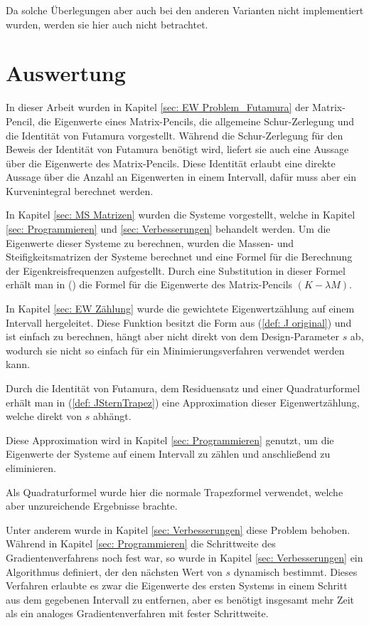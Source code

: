 \documentclass[a4paper,12pt]{report}
\newcommand{\1}{\mathds{1}}
\theoremstyle{plain} %
\theoremstyle{definition} %
\theoremstyle{remark}
\begin{document}
            Da solche Überlegungen aber auch bei den anderen Varianten nicht implementiert wurden, werden sie hier auch nicht betrachtet.
\chapter{Auswertung}
\label{sec: Auswertung}

      In dieser Arbeit wurden in Kapitel \ref{sec: EW Problem_Futamura} der Matrix-Pencil, die Eigenwerte eines Matrix-Pencils, die allgemeine Schur-Zerlegung und die Identität von Futamura vorgestellt.
      Während die Schur-Zerlegung für den Beweis der Identität von Futamura benötigt wird, liefert sie auch eine Aussage über die Eigenwerte des Matrix-Pencils.
      Diese Identität erlaubt eine direkte Aussage über die Anzahl an Eigenwerten in einem Intervall, dafür muss aber ein Kurvenintegral berechnet werden.

      In Kapitel \ref{sec: MS Matrizen} wurden die Systeme vorgestellt, welche in Kapitel \ref{sec: Programmieren} und \ref{sec: Verbesserungen} behandelt werden.
      Um die Eigenwerte dieser Systeme zu berechnen, wurden die Massen- und Steifigkeitsmatrizen der Systeme berechnet und eine Formel für die Berechnung der Eigenkreisfrequenzen aufgestellt.
      Durch eine Substitution in dieser Formel erhält man in () die Formel für die Eigenwerte des Matrix-Pencils $(K-\lambda M)$.

      In Kapitel \ref{sec: EW Zählung} wurde die gewichtete Eigenwertzählung auf einem Intervall hergeleitet. Diese Funktion besitzt die Form aus (\ref{def: J original}) und ist einfach zu berechnen, hängt aber nicht direkt von dem Design-Parameter $s$ ab,
      wodurch sie nicht so einfach für ein Minimierungsverfahren verwendet werden kann.

      Durch die Identität von Futamura, dem Residuensatz und einer Quadraturformel erhält man in (\ref{def: JSternTrapez}) eine Approximation dieser Eigenwertzählung, welche direkt von $s$ abhängt.

      Diese Approximation wird in Kapitel \ref{sec: Programmieren} genutzt, um die Eigenwerte der Systeme auf einem Intervall zu zählen und anschließend zu eliminieren.
      
      Als Quadraturformel wurde hier die normale Trapezformel verwendet, welche aber unzureichende Ergebnisse brachte.

      Unter anderem wurde in Kapitel \ref{sec: Verbesserungen} diese Problem behoben.
      Während in Kapitel \ref{sec: Programmieren} die Schrittweite des Gradientenverfahrens noch fest war, so wurde in Kapitel \ref{sec: Verbesserungen} ein Algorithmus definiert, der den nächsten Wert von $s$ dynamisch bestimmt.
      Dieses Verfahren erlaubte es zwar die Eigenwerte des ersten Systems in einem Schritt aus dem gegebenen Intervall zu entfernen, aber es benötigt insgesamt mehr Zeit als ein analoges Gradientenverfahren mit fester Schrittweite.
\end{document}
